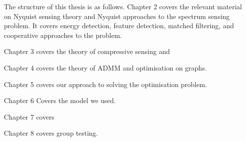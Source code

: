 \documentclass{article}
\begin{document}
The structure of this thesis is as follows. Chapter 2 covers the relevant material on Nyquist sensing theory and Nyquist approaches to the spectrum sensing problem. It covers energy detection, feature detection, matched filtering, and cooperative approaches to the problem.

Chapter 3 covers the theory of compressive sensing and 

Chapter 4 covers the theory of ADMM and optimisation on graphs.

Chapter 5 covers our approach to solving the optimisation problem.

Chapter 6 Covers the model we used.

Chapter 7 covers

Chapter 8 covers group testing.
\end{document}
